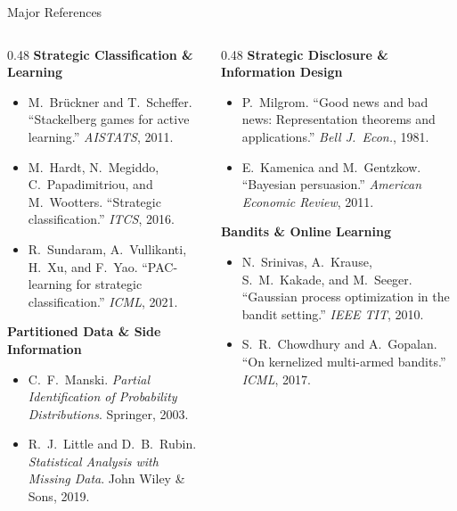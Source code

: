 \documentclass[aspectratio=169, 11pt, t, xcolor=table]{beamer}
\begin{document}
\begin{frame}{Major References}
\scriptsize
\begin{columns}[T,onlytextwidth]
\begin{column}{0.48\textwidth}
\textbf{Strategic Classification \& Learning}
\begin{itemize}\itemsep=3pt
  \item M.~Br\"uckner and T.~Scheffer. ``Stackelberg games for active learning.'' \emph{AISTATS}, 2011.
  \item M.~Hardt, N.~Megiddo, C.~Papadimitriou, and M.~Wootters. ``Strategic classification.'' \emph{ITCS}, 2016.
  \item R.~Sundaram, A.~Vullikanti, H.~Xu, and F.~Yao. ``PAC-learning for strategic classification.'' \emph{ICML}, 2021.
\end{itemize}

\vspace{0.4em}
\textbf{Partitioned Data \& Side Information}
\begin{itemize}\itemsep=3pt
  \item C.~F.~Manski. \emph{Partial Identification of Probability Distributions}. Springer, 2003.
  \item R.~J.~Little and D.~B.~Rubin. \emph{Statistical Analysis with Missing Data}. John Wiley \& Sons, 2019.
\end{itemize}
\end{column}

\begin{column}{0.48\textwidth}
\textbf{Strategic Disclosure \& Information Design}
\begin{itemize}\itemsep=3pt
  \item P.~Milgrom. ``Good news and bad news: Representation theorems and applications.'' \emph{Bell J.\ Econ.}, 1981.
  \item E.~Kamenica and M.~Gentzkow. ``Bayesian persuasion.'' \emph{American Economic Review}, 2011.
\end{itemize}

\vspace{0.4em}
\textbf{Bandits \& Online Learning}
\begin{itemize}\itemsep=3pt
  \item N.~Srinivas, A.~Krause, S.~M.~Kakade, and M.~Seeger. ``Gaussian process optimization in the bandit setting.'' \emph{IEEE TIT}, 2010.
  \item S.~R.~Chowdhury and A.~Gopalan. ``On kernelized multi-armed bandits.'' \emph{ICML}, 2017.
\end{itemize}
\end{column}
\end{columns}
\end{frame}
\end{document}

